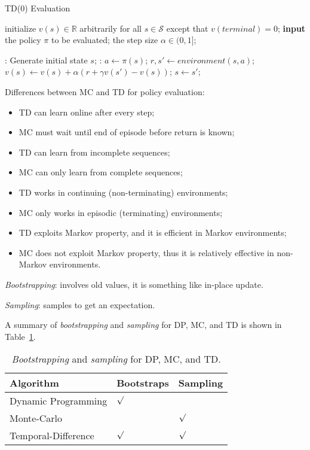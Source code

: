\documentclass{progartcn}
\begin{document}
		\begin{algorithm}[h]
		\caption{TD(0) Evaluation}
		\label{alg: TD(0) Evaluation}
		\begin{algorithmic}[1]
            \State initialize $v(s)\in\mathbb{R}$ arbitrarily for all $s\in\mathcal{S}$ except that $v(terminal)=0$;
            \State \textbf{input} the policy $\pi$ to be evaluated; the step size $\alpha\in(0,1]$;
            
            :
            	\State Generate initial state $s$;
            	:
            		\State $a\gets\pi(s)$;
            		\State $r,s'\gets environment(s,a)$;
            		\State $v(s)\gets v(s)+\alpha(r+\gamma v(s')-v(s))$;
            		\State $s\gets s'$;
            	\EndWhile
            \EndFor
        \end{algorithmic}
        \end{algorithm}

		Differences between MC and TD for policy evaluation:
		\begin{itemize}[noitemsep,topsep=0pt]
			\item TD can learn online after every step;
			\item MC must wait until end of episode before return is known;
			\item TD can learn from incomplete sequences;
			\item MC can only learn from complete sequences;
			\item TD works in continuing (non-terminating) environments;
			\item MC only works in episodic (terminating) environments;
			\item TD exploits Markov property, and it is efficient in Markov environments;
			\item MC does not exploit Markov property, thus it is relatively effective in non-Markov environments.\\
		\end{itemize}
		
		\textit{Bootstrapping}: involves old values, it is something like in-place update. 

		\textit{Sampling}: samples to get an expectation. 

		A summary of \textit{bootstrapping} and \textit{sampling} for DP, MC, and TD is shown in Table~\ref{boot_samp}. 
		\begin{table}[H]
		\centering
		\begin{tabular}{|l|l|l|}
		\hline
		Algorithm           & Bootstraps & Sampling \\\hline
		Dynamic Programming & $\surd$          &         \\\hline
		Monte-Carlo         &           & $\surd$        \\\hline
		Temporal-Difference & $\surd$          & $\surd$     \\\hline
		\end{tabular}
		\caption{\textit{Bootstrapping} and \textit{sampling} for DP, MC, and TD.}
		\label{boot_samp}
		\end{table}
\end{document}
